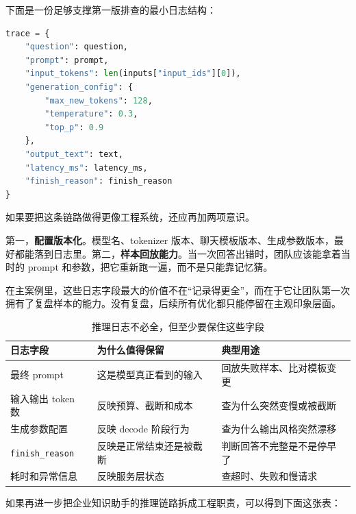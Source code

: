 下面是一份足够支撑第一版排查的最小日志结构：
\begin{lstlisting}[language=Python]
trace = {
    "question": question,
    "prompt": prompt,
    "input_tokens": len(inputs["input_ids"][0]),
    "generation_config": {
        "max_new_tokens": 128,
        "temperature": 0.3,
        "top_p": 0.9
    },
    "output_text": text,
    "latency_ms": latency_ms,
    "finish_reason": finish_reason
}
\end{lstlisting}

如果要把这条链路做得更像工程系统，还应再加两项意识。

第一，\textbf{配置版本化}。模型名、tokenizer 版本、聊天模板版本、生成参数版本，最好都能落到日志里。第二，\textbf{样本回放能力}。当一次回答出错时，团队应该能拿着当时的 prompt 和参数，把它重新跑一遍，而不是只能靠记忆猜。

在主案例里，这些日志字段最大的价值不在“记录得更全”，而在于它让团队第一次拥有了复盘样本的能力。没有复盘，后续所有优化都只能停留在主观印象层面。

\begin{table}[H]
\centering
\small
\begin{tabularx}{\textwidth}{>{\raggedright\arraybackslash}p{3.1cm}>{\raggedright\arraybackslash}p{3.3cm}>{\raggedright\arraybackslash}X}
\toprule
\textbf{日志字段} & \textbf{为什么值得保留} & \textbf{典型用途} \\
\midrule
最终 prompt & 这是模型真正看到的输入 & 回放失败样本、比对模板变更 \\
输入输出 token 数 & 反映预算、截断和成本 & 查为什么突然变慢或被截断 \\
生成参数配置 & 反映 decode 阶段行为 & 查为什么输出风格突然漂移 \\
\texttt{finish\_reason} & 反映是正常结束还是被截断 & 判断回答不完整是不是停早了 \\
耗时和异常信息 & 反映服务层状态 & 查超时、失败和慢请求 \\
\bottomrule
\end{tabularx}
\caption{推理日志不必全，但至少要保住这些字段}
\label{tab:trace-fields}
\end{table}

如果再进一步把企业知识助手的推理链路拆成工程职责，可以得到下面这张表：

